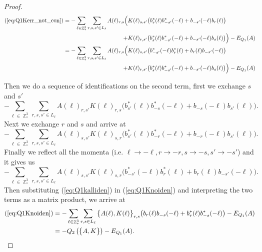 \documentclass[sn-mathphys, Numbered ,a4paper]{sn-jnl}%
\DeclareMathOperator{\Z}{\mathbb{Z}}
\theoremstyle{plain}
\theoremstyle{definition}
\theoremstyle{remark}
\theoremstyle{plain}
\theoremstyle{definition}
\theoremstyle{remark}
\begin{document}
\begin{proof}
\begin{align}
    (\ref{eq:Q1Kerr_not_con}) = -\sum\limits_{\ell \in \Z^3_*}\sum\limits_{r,s,s' \in L_{\ell}}A(\ell)_{r,s}
    \Big(&K(\ell)_{s,s'}\big(b^*_{r}(\ell)b^*_{-s'}(-\ell)+b_{-s'}(-\ell)b_{r}(\ell)\big)\nonumber\\ + &K(\ell)_{r,s'}\big(b^*_{s}(\ell)b^*_{-s'}(-\ell) +b_{-s'}(-\ell)b_{s}(\ell) \big)\Big) - E_{Q_1}(A)\nonumber\\
    =-\sum\limits_{\ell \in \Z^3_*}\sum\limits_{r,s,s' \in L_{\ell}}A(\ell)_{r,s}
    \Big(&K(\ell)_{s,s'}\big(b^*_{-s'}(-\ell)b^*_{r}(\ell)+b_{r}(\ell)b_{-s'}(-\ell)\big)\nonumber\\ + &K(\ell)_{r,s'}\big(b^*_{s}(\ell)b^*_{-s'}(-\ell) +b_{-s'}(-\ell)b_{s}(\ell) \big)\Big) - E_{Q_1}(A)\label{eq:Q1Knoiden}
\end{align}

Then we do a sequence of identifications on the second term, first we exchange $s$ and $s'$ 
\begin{equation}
    -\sum\limits_{\ell \in \Z^3_*}\sum\limits_{r,s,s' \in L_{\ell}}A(\ell)_{r,s'}K(\ell)_{r,s}\big(b^*_{s'}(\ell)b^*_{-s}(-\ell)+b_{-s}(-\ell)b_{s'}(\ell) \big).
\end{equation}
Next we exchange $r$ and $s$ and arrive at
\begin{equation}
    -\sum\limits_{\ell \in \Z^3_*}\sum\limits_{r,s,s' \in L_{\ell}}A(\ell)_{s,s'}K(\ell)_{s,r}\big(b^*_{s'}(\ell)b^*_{-r}(-\ell) +b_{-r}(-\ell)b_{s'}(\ell)\big).
\end{equation}
Finally we reflect all the momenta (i.e. $\ell\rightarrow -\ell,r\rightarrow -r,s\rightarrow -s,s'\rightarrow -s'$) and it gives us
\begin{equation}\label{eq:Q1kalliden}
    -\sum\limits_{\ell \in \Z^3_*}\sum\limits_{r,s,s' \in L_{\ell}}A(\ell)_{s,s'}K(\ell)_{s,r}\big(b^*_{-s'}(-\ell)b^*_{r}(\ell) +b_{r}(\ell)b_{-s'}(-\ell)\big).
\end{equation}
Then substituting (\ref{eq:Q1kalliden}) in (\ref{eq:Q1Knoiden}) and interpreting the two terms as a matrix product, we arrive at
\begin{align}
    (\ref{eq:Q1Knoiden}) &= -\sum\limits_{\ell \in \Z^3_*}\sum\limits_{r,s \in L_{\ell}}\big\{A(\ell), K(\ell)\big\}_{r,s}\big(b_{r}(\ell)b_{-s}(-\ell)+b^*_{r}(\ell)b^*_{-s}(-\ell)  \big) - E_{Q_1}(A)\\
    &= -Q_2\left(\big\{A, K\big\}\right) - E_{Q_1}(A).
\end{align}
\end{proof}
\end{document}
